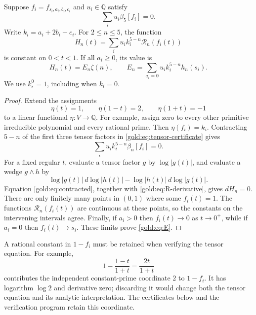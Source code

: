 \begin{lemma}
\label{gold:lem:descent}
Suppose $f_i=f_{s_i,a_i,b_i,c_i}$ and $u_i\in\mathbb Q$ satisfy
\begin{equation}
 \sum_i u_i\beta_5[f_i]=0.
 \label{gold:eq:tensor-certificate}
\end{equation}
Write $k_i=a_i+2b_i-c_i$.  For $2\le n\le5$, the function
\begin{equation}
 H_n(t)=\sum_i u_i k_i^{5-n}\mathcal R_n(f_i(t))
 \label{gold:eq:functional-family}
\end{equation}
is constant on $0<t<1$.  If all $a_i\ge0$, its value is
\begin{equation}
 H_n(t)=E_n\zeta(n),\qquad
 E_n=\sum_{a_i=0}u_i k_i^{5-n}h_n(s_i).
 \label{gold:eq:E}
\end{equation}
We use $k_i^0=1$, including when $k_i=0$.
\end{lemma}

\begin{proof}
Extend the assignments
\[
 \eta(t)=1,\qquad \eta(1-t)=2,\qquad \eta(1+t)=-1
\]
to a linear functional $\eta:V\to\mathbb Q$.  For example, assign
zero to every other primitive irreducible polynomial and every rational
prime.  Then $\eta(f_i)=k_i$.  Contracting $5-n$ of the first three
tensor factors in \eqref{gold:eq:tensor-certificate} gives
\begin{equation}
 \sum_i u_i k_i^{5-n}\beta_n[f_i]=0.
 \label{gold:eq:contracted}
\end{equation}
For a fixed regular $t$, evaluate a tensor factor $g$ by $\log|g(t)|$,
and evaluate a wedge $g\wedge h$ by
\[
 \log|g(t)|\,d\log|h(t)|
 -\log|h(t)|\,d\log|g(t)|.
\]
Equation \eqref{gold:eq:contracted}, together with
\eqref{gold:eq:R-derivative}, gives $dH_n=0$.
There are only finitely many points in $(0,1)$ where some $f_i(t)=1$.
The functions $\mathcal R_n(f_i(t))$ are continuous at these points,
so the constants on the intervening intervals agree.
Finally, if $a_i>0$ then $f_i(t)\to0$ as $t\to0^+$, while if
$a_i=0$ then $f_i(t)\to s_i$.  These limits prove \eqref{gold:eq:E}.
\end{proof}

A rational constant in $1-f_i$ must be retained when verifying the
tensor equation.  For example,
\[
 1-\frac{1-t}{1+t}=\frac{2t}{1+t}
\]
contributes the independent constant-prime coordinate $2$ to $1-f_i$.
It has logarithm $\log2$ and derivative zero; discarding it would change
both the tensor equation and its analytic interpretation.  The
certificates below and the verification program retain this coordinate.

